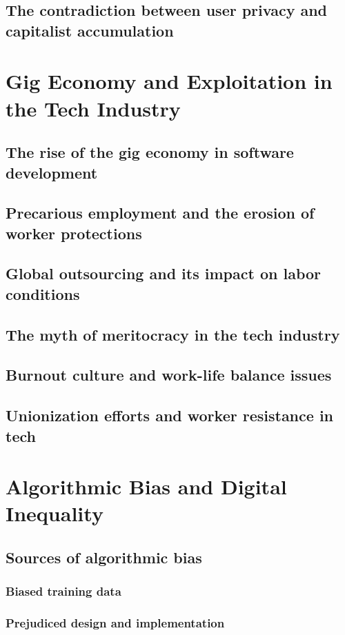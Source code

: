\subsection{The contradiction between user privacy and capitalist accumulation}

\newpage
\section{Gig Economy and Exploitation in the Tech Industry}
\subsection{The rise of the gig economy in software development}
\subsection{Precarious employment and the erosion of worker protections}
\subsection{Global outsourcing and its impact on labor conditions}
\subsection{The myth of meritocracy in the tech industry}
\subsection{Burnout culture and work-life balance issues}
\subsection{Unionization efforts and worker resistance in tech}

\newpage
\section{Algorithmic Bias and Digital Inequality}
\subsection{Sources of algorithmic bias}
\subsubsection{Biased training data}
\subsubsection{Prejudiced design and implementation}
